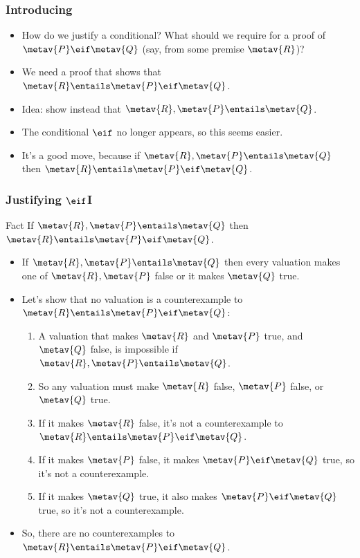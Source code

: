 \begin{frame}
  \frametitle{Introducing \eif}

  \begin{itemize}[<+->]
  \item How do we justify a conditional? What should we require for a proof
  of $\metav{P} \eif \metav{Q}$ (say, from some premise $\metav{R}$)?

  \item We need a proof that shows that $\metav{R} \entails \metav{P} \eif
  \metav{Q}$.

  \item Idea: show instead that $\metav{R}, \metav{P} \entails \metav{Q}$.

  \item The conditional $\eif$ no longer appears, so this seems easier.

  \item It's a good move, because if $\metav{R}, \metav{P} \entails
  \metav{Q}$
  then $\metav{R} \entails \metav{P} \eif
  \metav{Q}$.
  \end{itemize}
\end{frame}

\begin{frame}
  \frametitle{Justifying $\eif$I}
  \begin{block}{Fact}
  If $\metav{R}, \metav{P} \entails
  \metav{Q}$
  then
  $\metav{R} \entails \metav{P} \eif
  \metav{Q}$.
  \end{block}

  \begin{itemize}[<+->]
    \item If $\metav{R}, \metav{P} \entails
    \metav{Q}$ then every valuation makes one of $\metav{R},
    \metav{P}$ false or it makes $\metav{Q}$ true.
    \item Let's show that no valuation is a counterexample to $\metav{R} \entails \metav{P} \eif
    \metav{Q}$:
    \begin{enumerate}
      \item A valuation that makes $\metav{R}$ and
    $\metav{P}$ true, and $\metav{Q}$ false, is impossible if  $\metav{R}, \metav{P} \entails
    \metav{Q}$.
    \item So any valuation must make $\metav{R}$ false, $\metav{P}$
    false, or $\metav{Q}$ true.
    \item If it makes $\metav{R}$ false, it's not a counterexample to $\metav{R} \entails \metav{P} \eif
    \metav{Q}$.
    \item If it makes $\metav{P}$ false, it makes $\metav{P} \eif
    \metav{Q}$ true, so it's not a counterexample.
    \item If it makes $\metav{Q}$ true, it also makes $\metav{P} \eif
    \metav{Q}$ true, so it's not a counterexample.
    \end{enumerate}
    \item So, there are no counterexamples to $\metav{R} \entails \metav{P} \eif
    \metav{Q}$.
  \end{itemize}
\end{frame}

